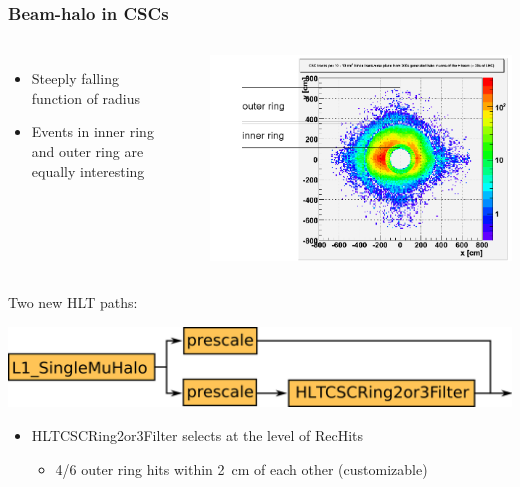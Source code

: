 \documentclass[compress]{beamer}
\begin{document}
\begin{frame}
\frametitle{Beam-halo in CSCs}
\begin{columns}
\begin{itemize}
\item Steeply falling function of radius
\item Events in inner ring and outer ring are equally interesting
\end{itemize}

\vspace{1 cm}
\mbox{ }

\hspace{-0.75 cm} \includegraphics[width=\linewidth]{beam-halo.png}
\end{columns}

\vspace{-0.2 cm}
Two new HLT paths:
\begin{center}
\includegraphics[height=1.3 cm]{path_beamhalo.png}
\end{center}

\begin{itemize}
\item HLTCSCRing2or3Filter selects at the level of RecHits
\begin{itemize}
\item 4/6 outer ring hits within 2~cm of each other (customizable)
\end{itemize}
\end{itemize}
\end{frame}
\end{document}
